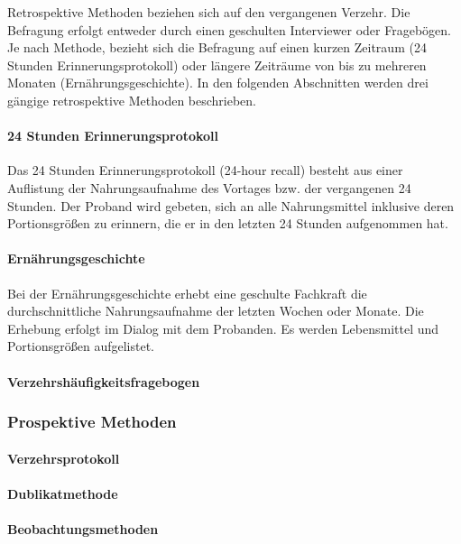 Retrospektive Methoden beziehen sich auf den vergangenen Verzehr.  Die Befragung erfolgt entweder durch einen geschulten Interviewer oder Fragebögen. Je nach Methode, bezieht sich die Befragung auf einen kurzen Zeitraum (24 Stunden Erinnerungsprotokoll) oder längere Zeiträume von bis zu mehreren Monaten (Ernährungsgeschichte). In den folgenden Abschnitten werden drei gängige retrospektive Methoden beschrieben. 


\paragraph{24 Stunden Erinnerungsprotokoll}

Das 24 Stunden Erinnerungsprotokoll (24-hour recall) besteht aus einer Auflistung der Nahrungsaufnahme des Vortages bzw. der vergangenen 24 Stunden. Der Proband wird gebeten, sich an alle Nahrungsmittel inklusive deren Portionsgrößen zu erinnern, die er in den letzten 24 Stunden aufgenommen hat. 

\paragraph{Ernährungsgeschichte}

Bei der Ernährungsgeschichte erhebt eine geschulte Fachkraft die durchschnittliche Nahrungsaufnahme der letzten Wochen oder Monate. Die Erhebung erfolgt im Dialog mit dem Probanden. Es werden Lebensmittel und Portionsgrößen aufgelistet. 

\paragraph{Verzehrshäufigkeitsfragebogen}


\subsubsection{Prospektive Methoden}

\paragraph{Verzehrsprotokoll}

\paragraph{Dublikatmethode}

\paragraph{Beobachtungsmethoden}

